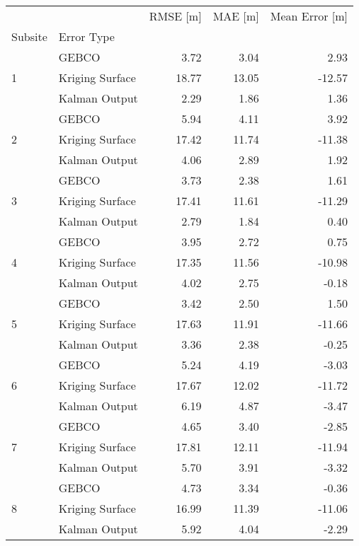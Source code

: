 \label{tab:appendix_oahu_raster_error}
\begin{tabular}{llrrr}
\toprule
 &  & RMSE [m] & MAE [m] & Mean Error [m] \\
Subsite & Error Type &  &  &  \\
\midrule
\multirow[c]{3}{*}{1} & GEBCO & 3.72 & 3.04 & 2.93 \\
 & Kriging Surface & 18.77 & 13.05 & -12.57 \\
 & Kalman Output & 2.29 & 1.86 & 1.36 \\
\cline{1-2}
\multirow[c]{3}{*}{2} & GEBCO & 5.94 & 4.11 & 3.92 \\
 & Kriging Surface & 17.42 & 11.74 & -11.38 \\
 & Kalman Output & 4.06 & 2.89 & 1.92 \\
\cline{1-2}
\multirow[c]{3}{*}{3} & GEBCO & 3.73 & 2.38 & 1.61 \\
 & Kriging Surface & 17.41 & 11.61 & -11.29 \\
 & Kalman Output & 2.79 & 1.84 & 0.40 \\
\cline{1-2}
\multirow[c]{3}{*}{4} & GEBCO & 3.95 & 2.72 & 0.75 \\
 & Kriging Surface & 17.35 & 11.56 & -10.98 \\
 & Kalman Output & 4.02 & 2.75 & -0.18 \\
\cline{1-2}
\multirow[c]{3}{*}{5} & GEBCO & 3.42 & 2.50 & 1.50 \\
 & Kriging Surface & 17.63 & 11.91 & -11.66 \\
 & Kalman Output & 3.36 & 2.38 & -0.25 \\
\cline{1-2}
\multirow[c]{3}{*}{6} & GEBCO & 5.24 & 4.19 & -3.03 \\
 & Kriging Surface & 17.67 & 12.02 & -11.72 \\
 & Kalman Output & 6.19 & 4.87 & -3.47 \\
\cline{1-2}
\multirow[c]{3}{*}{7} & GEBCO & 4.65 & 3.40 & -2.85 \\
 & Kriging Surface & 17.81 & 12.11 & -11.94 \\
 & Kalman Output & 5.70 & 3.91 & -3.32 \\
\cline{1-2}
\multirow[c]{3}{*}{8} & GEBCO & 4.73 & 3.34 & -0.36 \\
 & Kriging Surface & 16.99 & 11.39 & -11.06 \\
 & Kalman Output & 5.92 & 4.04 & -2.29 \\
\cline{1-2}
\bottomrule
\end{tabular}
